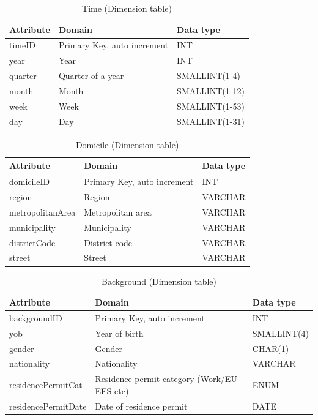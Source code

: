 \begin{table}[htbp]
  \centering
  \caption{Time (Dimension table)}
  \begin{tabular}{|l|l|l|}
    \hline
    \textbf{Attribute} & \textbf{Domain} & \textbf{Data type} \\
    \hline
    timeID & Primary Key, auto increment & INT \\
    \hline
    year & Year & INT \\
    \hline
    quarter & Quarter of a year & SMALLINT(1-4) \\
    \hline
    month & Month & SMALLINT(1-12) \\
    \hline
    week & Week & SMALLINT(1-53) \\
    \hline
    day & Day & SMALLINT(1-31) \\
    \hline
  \end{tabular}
\end{table}

\begin{table}[htbp]
  \centering
  \caption{Domicile (Dimension table)}
  \begin{tabular}{|l|l|l|}
    \hline
    \textbf{Attribute} & \textbf{Domain} & \textbf{Data type} \\
    \hline
    domicileID & Primary Key, auto increment & INT \\
    \hline
    region & Region & VARCHAR \\
    \hline
    metropolitanArea & Metropolitan area & VARCHAR \\
    \hline
    municipality & Municipality & VARCHAR \\
    \hline
    districtCode & District code & VARCHAR \\
    \hline
    street & Street & VARCHAR \\
    \hline
  \end{tabular}
\end{table}

\begin{table}[htbp]
  \centering
  \caption{Background (Dimension table)}
  \begin{tabular}{|l|l|l|}
    \hline
    \textbf{Attribute} & \textbf{Domain} & \textbf{Data type} \\
    \hline
    backgroundID & Primary Key, auto increment & INT \\
    \hline
    yob & Year of birth & SMALLINT(4) \\
    \hline
    gender & Gender & CHAR(1) \\
    \hline
    nationality & Nationality & VARCHAR \\
    \hline
    residencePermitCat & Residence permit category (Work/EU-EES etc) & ENUM \\
    \hline
    residencePermitDate & Date of residence permit & DATE \\
    \hline
  \end{tabular}
\end{table}


